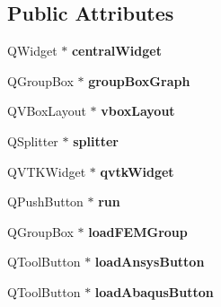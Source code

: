 \subsection*{Public Attributes}
\begin{DoxyCompactItemize}
\item 
\hypertarget{class_ui___main_window_a30075506c2116c3ed4ff25e07ae75f81}{
QWidget $\ast$ {\bfseries centralWidget}}
\label{class_ui___main_window_a30075506c2116c3ed4ff25e07ae75f81}

\item 
\hypertarget{class_ui___main_window_abd799eb53405d7178957e44734720f79}{
QGroupBox $\ast$ {\bfseries groupBoxGraph}}
\label{class_ui___main_window_abd799eb53405d7178957e44734720f79}

\item 
\hypertarget{class_ui___main_window_a3260f8759d997f75cf8450d3728639b3}{
QVBoxLayout $\ast$ {\bfseries vboxLayout}}
\label{class_ui___main_window_a3260f8759d997f75cf8450d3728639b3}

\item 
\hypertarget{class_ui___main_window_abfba98fab6f5677d35fa69dd46ef8ffb}{
QSplitter $\ast$ {\bfseries splitter}}
\label{class_ui___main_window_abfba98fab6f5677d35fa69dd46ef8ffb}

\item 
\hypertarget{class_ui___main_window_a5f95ca5ebd77792c4812da442a30aac4}{
QVTKWidget $\ast$ {\bfseries qvtkWidget}}
\label{class_ui___main_window_a5f95ca5ebd77792c4812da442a30aac4}

\item 
\hypertarget{class_ui___main_window_a12389375d40b7fa55e5267747f3357e5}{
QPushButton $\ast$ {\bfseries run}}
\label{class_ui___main_window_a12389375d40b7fa55e5267747f3357e5}

\item 
\hypertarget{class_ui___main_window_a86882b56e6c7072300538f8e928ab5d0}{
QGroupBox $\ast$ {\bfseries loadFEMGroup}}
\label{class_ui___main_window_a86882b56e6c7072300538f8e928ab5d0}

\item 
\hypertarget{class_ui___main_window_ab9f3786958f4f5046270f907fed2a849}{
QToolButton $\ast$ {\bfseries loadAnsysButton}}
\label{class_ui___main_window_ab9f3786958f4f5046270f907fed2a849}

\item 
\hypertarget{class_ui___main_window_a31f2d99fd6bd94877e010cb3c0ef2604}{
QToolButton $\ast$ {\bfseries loadAbaqusButton}}
\label{class_ui___main_window_a31f2d99fd6bd94877e010cb3c0ef2604}


\end{DoxyCompactItemize}
